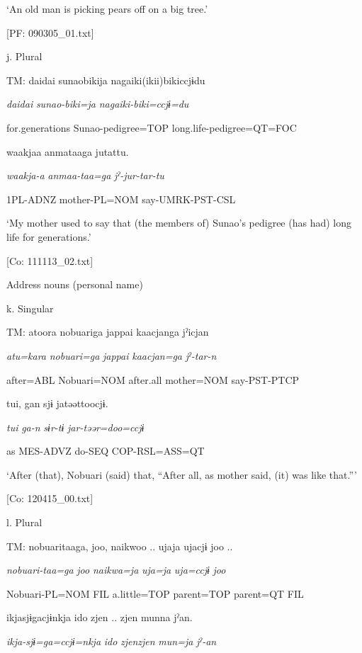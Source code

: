       ‘An old man is picking pears off on a big tree.’

      [PF: 090305\_01.txt]

  j.  Plural

    TM:  daidai  sunaobikija  nagaiki(ikii)bikiccjɨdu

      \textit{daidai}  \textit{sunao-biki=ja}  \textit{nagaiki-biki=ccjɨ=du}

      for.generations  Sunao-pedigree=TOP  long.life-pedigree=QT=FOC

      waakjaa  anmataaga  jutattu.

      \textit{waakja-a}  \textit{anmaa-taa=ga}  \textit{jˀ-jur-tar-tu}

      1PL-ADNZ  mother-PL=NOM  say-UMRK-PST-CSL

      ‘My mother used to say that (the members of) Sunao’s pedigree (has had) long life for generations.’

      [Co: 111113\_02.txt]

  Address nouns (personal name)

  k.  Singular

    TM:  atoora  nobuariga  jappai  {\textbar}kaacjan{\textbar}ga  jˀicjan

      \textit{atu=kara}  \textit{nobuari=ga}  \textit{jappai}  \textit{kaacjan=ga}  \textit{jˀ-tar-n}

      after=ABL  Nobuari=NOM  after.all  mother=NOM  say-PST-PTCP

      tui,  gan  sjɨ  jatəəttoocjɨ.

      \textit{tui}  \textit{ga-n}  \textit{sɨr-tɨ}  \textit{jar-təər=doo=ccjɨ}

      as  MES-ADVZ  do-SEQ  COP-RSL=ASS=QT

      ‘After (that), Nobuari (said) that, “After all, as mother said, (it) was like that.”’

      [Co: 120415\_00.txt]

  l.  Plural

    TM:  nobuaritaaga,  joo,  naikwoo ..  ujaja  ujacjɨ  joo ..

      \textit{nobuari-taa=ga}  \textit{joo}  \textit{naikwa=ja}  \textit{uja=ja}  \textit{uja=ccjɨ}  \textit{joo}

      Nobuari-PL=NOM  FIL  a.little=TOP  parent=TOP  parent=QT  FIL

      ikjasjɨgacjɨnkja  ido  zjen .. zjen  munna  jˀan.

      \textit{ikja-sjɨ=ga=ccjɨ=nkja}  \textit{ido}  \textit{zjenzjen}  \textit{mun=ja}  \textit{jˀ-an}

